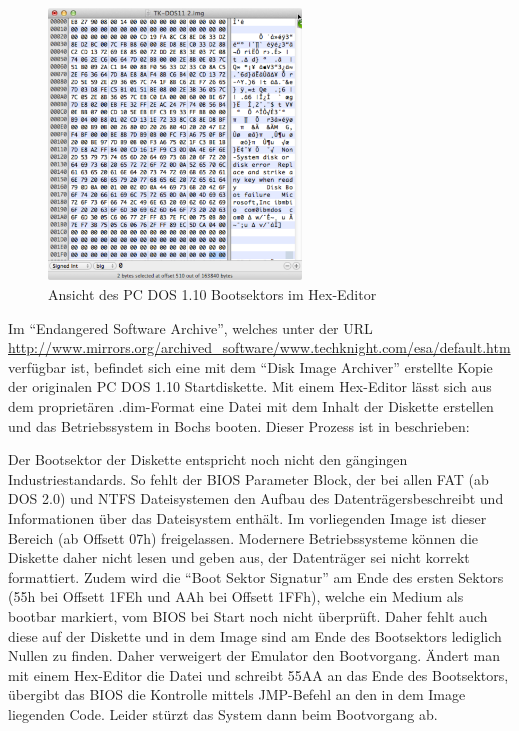 	\begin{figure}[h]
		\begin{center}
			\includegraphics[width=0.6\textwidth]{img/DOS110hex}
			\caption{Ansicht des PC DOS 1.10 Bootsektors im Hex-Editor}
			\label{fig:screenshot-hexeditor110}
		\end{center}
	\end{figure}

	Im "`Endangered Software Archive"', welches unter der URL \url{http://www.mirrors.org/archived_software/www.techknight.com/esa/default.htm} verfügbar ist, befindet sich eine mit dem "`Disk Image Archiver"' erstellte Kopie der originalen PC DOS 1.10 Startdiskette. 
	Mit einem Hex-Editor lässt sich aus dem proprietären .dim-Format eine Datei mit dem Inhalt der Diskette erstellen und das Betriebssystem in Bochs booten.
	Dieser Prozess ist in \cite{PCMinistry} beschrieben:

	Der Bootsektor der Diskette entspricht noch nicht den gängingen Industriestandards.
	So fehlt der BIOS Parameter Block, der bei allen FAT (ab DOS 2.0) und NTFS Dateisystemen den Aufbau des Datenträgersbeschreibt und Informationen über das Dateisystem enthält. Im vorliegenden Image ist dieser Bereich (ab Offsett 07h) freigelassen.
	Modernere Betriebssysteme können die Diskette daher nicht lesen und geben aus, der Datenträger sei nicht korrekt formattiert. 
	Zudem wird die "`Boot Sektor Signatur"' am Ende des ersten Sektors (55h bei Offsett 1FEh und AAh bei Offsett 1FFh), welche ein Medium als bootbar markiert, vom BIOS bei Start noch nicht überprüft. \cite{IBMTechRef} Daher fehlt auch diese auf der Diskette und in dem Image sind am Ende des Bootsektors lediglich Nullen zu finden.
	Daher verweigert der Emulator den Bootvorgang.
	Ändert man mit einem Hex-Editor die Datei und schreibt 55AA an das Ende des Bootsektors, übergibt das BIOS die Kontrolle mittels JMP-Befehl an den in dem Image liegenden Code. Leider stürzt das System dann beim Bootvorgang ab.

